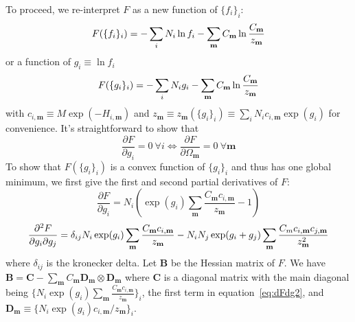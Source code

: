 To proceed, we re-interpret $F$ as a new function of $\{f_{i}\}_{i}$:
\begin{equation}
F(\{f_{i}\}_{i}) = - \sum_{i}^{} N_i \ln f_{i} \\ 
-\sum_{\mathbf{m}}^{} C_{\mathbf{m}} \ln \frac{C_{\mathbf{m}}}{z_{\mathbf{m}}} 
\label{eq:Fexf}
\end{equation}
or a function of $g_{i} \equiv \ln f_{i}$
\begin{equation}
F(\{g_{i}\}_{i}) = - \sum_{i}^{} N_i g_{i} \\ 
-\sum_{\mathbf{m}}^{} C_{\mathbf{m}} \ln \frac{C_{\mathbf{m}}}{z_{\mathbf{m}}} 
\label{eq:Fexg}
\end{equation}
with $c_{i,\mathbf{m}} \equiv M \exp(-H_{i,\mathbf{m}})$ and 
$z_{\mathbf{m}} \equiv z_{\mathbf{m}}(\{g_{i}\}_{i}) \equiv \sum\limits_{i}^{} N_{i} c_{i,\mathbf{m}} \exp(g_{i})$ 
for convenience. It's straightforward to show that
\begin{equation}
\frac{\partial F}{\partial g_{i}} = 0 \: \forall i 
\Leftrightarrow 
\frac{\partial F}{\partial \Omega_{\mathbf{m}}} = 0 \: \forall \mathbf{m}
\label{eq:Fequiv}
\end{equation}
To show that $F(\{g_{i}\}_{i})$ is a convex function of $\{g_{i}\}_{i}$ and thus has one 
global minimum, we first give the first and second partial derivatives of $F$:
\begin{equation}
\frac{\partial F}{\partial g_{i}}  = N_{i} (\exp(g_{i}) \sum_{\mathbf{m}}^{} \frac{C_{\mathbf{m}} c_{i,\mathbf{m}} }{z_{\mathbf{m}}} -1)
\label{eq:dFdg}
\end{equation}
\begin{equation}
\frac{\partial^2 F }{\partial g_{i} \partial g_{j}} =  \\
\delta_{ij} N_{i} \exp(g_{i}) \sum_{\mathbf{m}}^{} \frac{C_{\mathbf{m}} c_{i,\mathbf{m}}}{z_{\mathbf{m}}} - \\
N_{i} N_{j} \exp(g_{i}+g_{j}) \sum_{\mathbf{m}}^{} \frac{C_{m}c_{i,\mathbf{m}}c_{j,\mathbf{m}}}{z_{\mathbf{m}}^2}
\label{eq:dFdg2}
\end{equation}
where $\delta_{ij}$ is the kronecker delta. Let $\mathbf{B}$ be the Hessian matrix of $F$. We 
have $\mathbf{B} = \mathbf{C} - \sum\limits_{\mathbf{m}}^{} C_{\mathbf{m}} \mathbf{D}_{\mathbf{m}} \otimes \mathbf{D}_{\mathbf{m}}$ 
where $\mathbf{C}$ is a diagonal matrix with the main diagonal being 
$\{N_{i} \exp(g_{i}) \sum\limits_{\mathbf{m}}^{} \frac{C_{\mathbf{m}} c_{i,\mathbf{m}}}{z_{\mathbf{m}}}\}_{i}$, 
the first term in equation~\ref{eq:dFdg2}, and $\mathbf{D}_{\mathbf{m}} \equiv \{N_{i} \exp(g_{i}) c_{i,\mathbf{m}}/z_{\mathbf{m}}\}_{i}$.
